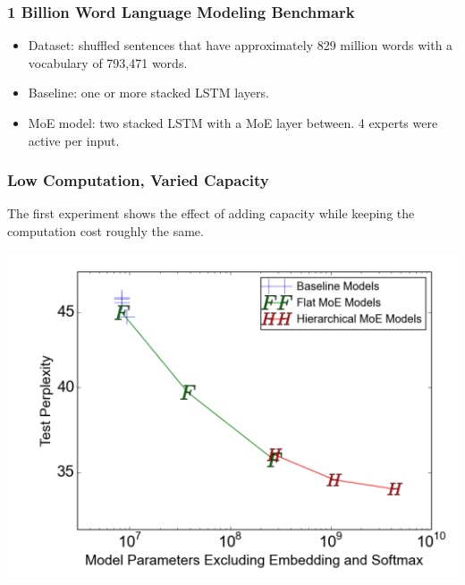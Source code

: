 \documentclass[12pt,aspectratio=169]{beamer}
\begin{document}
    \begin{frame}
        \frametitle{1 Billion Word Language Modeling Benchmark}

        \begin{itemize}
            \setlength{\itemsep}{.8em}
            \item Dataset: shuffled sentences that have approximately 829 million words with a vocabulary of 793,471 words.
            \item Baseline: one or more stacked LSTM layers.
            \item MoE model: two stacked LSTM with a MoE layer between. 4 experts were active per input.
        \end{itemize}
    \end{frame}

    \begin{frame}
        \frametitle{Low Computation, Varied Capacity}

        The first experiment shows the effect of adding capacity while keeping the computation cost roughly the same.

        \centering
        \includegraphics[scale=0.35]{exp1.png}
    \end{frame}

\end{document}
